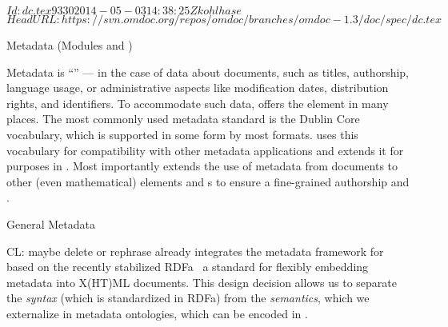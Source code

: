 \svnInfo $Id: dc.tex 9330 2014-05-03 14:38:25Z kohlhase $
\svnKeyword $HeadURL: https://svn.omdoc.org/repos/omdoc/branches/omdoc-1.3/doc/spec/dc.tex $

\begin{tchapter}[id=metadata,short=Metadata]{Metadata (Modules {} and  {})}

  Metadata is ``{}'' --- in the case of {\omdoc}
  data about documents, such as titles, authorship, language usage, or administrative
  aspects like modification dates, distribution rights, and identifiers. To accommodate
  such data, {\omdoc} offers the {} element in many places. The most
  commonly used metadata standard is the Dublin Core vocabulary, which is supported in
  some form by most formats. {\omdoc} uses this vocabulary for compatibility with other
  metadata applications and extends it for {} purposes in
  {\omdoc}.  Most importantly {\omdoc} extends the use of metadata from documents to other
  (even mathematical) elements and {s} to ensure a
  fine-grained authorship and {}.

\begin{tsection}{General Metadata}\label{sec:genmeta}
  \begin{oldpart}{CL: maybe delete or rephrase}
    {} already integrates the metadata framework for
    {} based on the recently stabilized
    RDFa~\cite{AdidaEtAl08:RDFa} a standard for flexibly embedding
    metadata into X(HT)ML documents. This design decision allows us to
    separate the {\emph{syntax}} (which is standardized in RDFa) from
    the {\emph{semantics}}, which we externalize in metadata
    ontologies, which can be encoded in {\omdoc}.
  \end{oldpart}


\newcommand{\xcmd}[1]{#1\xspace }
\newcommand{\ncmd}[1]{\mbox{#1}}
\newcommand{\xncmd}[1]{\xcmd{\ncmd{#1}}}
\newcommand{\ccrel}{\xncmd{ccREL}}
\newcommand{\curie}{\xncmd{CURIE}}
\newcommand{\curies}{\xncmd{CURIEs}}
\newcommand{\dcmi}{\xncmd{DCMI}}
\newcommand{\mmt}{\xncmd{MMT}}
\newcommand{\rdfs}{\xncmd{RDFS}}
\newcommand{\uris}{\xncmd{URIs}}
\newcommand{\cf}[1][\ ]{cf.#1}
\newcommand{\eg}[1][\ ]{e.\,g.#1}
\newcommand{\ie}[1][\ ]{i.\,e.#1}
\newcommand{\wrt}[1][\ ]{w.\,r.\,t.#1}
\newcommand{\identifier}[1]{\ifmmode\mathit{#1}\else\textit{#1\/}\fi}
\newcommand{\person}[1]{\textsc{#1}}


\end{tsection}
\end{tchapter}
